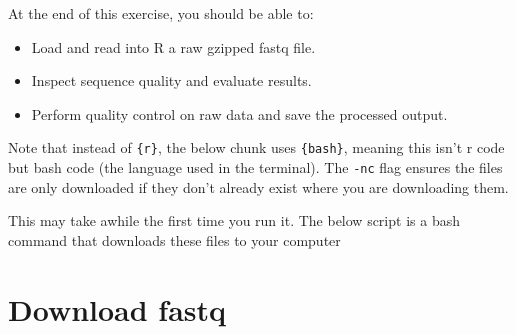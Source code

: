 \documentclass[
]{book}
\providecommand{\tightlist}{%
  \setlength{\itemsep}{0pt}\setlength{\parskip}{0pt}}
\begin{document}
At the end of this exercise, you should be able to:

\begin{itemize}
\tightlist
\item
  Load and read into R a raw gzipped fastq file.
\item
  Inspect sequence quality and evaluate results.
\item
  Perform quality control on raw data and save the processed output.
\end{itemize}

Note that instead of \texttt{\{r\}}, the below chunk uses \texttt{\{bash\}}, meaning this isn't r code but bash code (the language used in the terminal). The \texttt{-nc} flag ensures the files are only downloaded if they don't already exist where you are downloading them.

This may take awhile the first time you run it. The below script is a bash command that downloads these files to your computer

\hypertarget{download-fastq}{%
\section{Download fastq}\label{download-fastq}}
\end{document}
